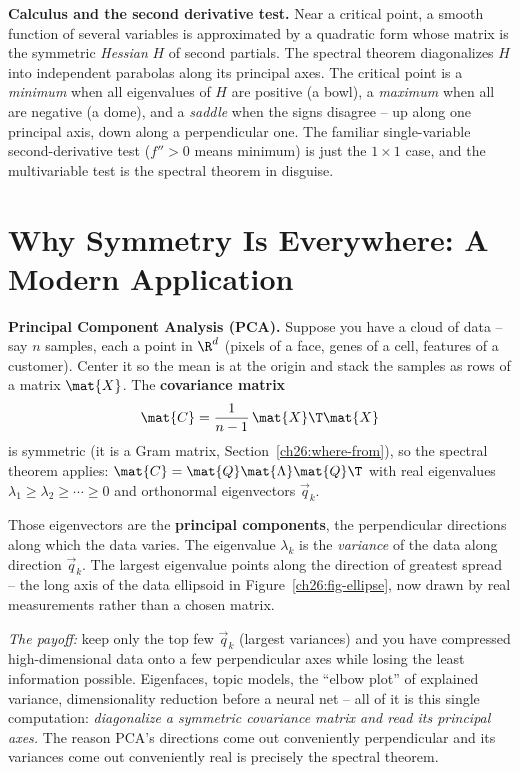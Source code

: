 \begin{connectionbox}
\textbf{Calculus and the second derivative test.} Near a critical point, a smooth
function of several variables is approximated by a quadratic form whose matrix is
the symmetric \emph{Hessian} $H$ of second partials. The spectral theorem
diagonalizes $H$ into independent parabolas along its principal axes. The critical
point is a \emph{minimum} when all eigenvalues of $H$ are positive (a bowl), a
\emph{maximum} when all are negative (a dome), and a \emph{saddle} when the signs
disagree -- up along one principal axis, down along a perpendicular one. The
familiar single-variable second-derivative test ($f''>0$ means minimum) is just
the $1\times 1$ case, and the multivariable test is the spectral theorem in
disguise.
\end{connectionbox}

\section{Why Symmetry Is Everywhere: A Modern Application}
\label{ch26:application}

\begin{applicationbox}
\textbf{Principal Component Analysis (PCA).} Suppose you have a cloud of data --
say $n$ samples, each a point in $\R^d$ (pixels of a face, genes of a cell,
features of a customer). Center it so the mean is at the origin and stack the
samples as rows of a matrix $\mat{X}$. The \textbf{covariance matrix}
\[
  \mat{C} = \frac{1}{n-1}\,\mat{X}\T\mat{X}
\]
is symmetric (it is a Gram matrix, Section~\ref{ch26:where-from}), so the spectral
theorem applies: $\mat{C} = \mat{Q}\mat{\Lambda}\mat{Q}\T$ with real eigenvalues
$\lambda_1 \ge \lambda_2 \ge \cdots \ge 0$ and orthonormal eigenvectors
$\vec{q}_k$.

Those eigenvectors are the \textbf{principal components}, the perpendicular
directions along which the data varies. The eigenvalue $\lambda_k$ is the
\emph{variance} of the data along direction $\vec{q}_k$. The largest eigenvalue
points along the direction of greatest spread -- the long axis of the data
ellipsoid in Figure~\ref{ch26:fig-ellipse}, now drawn by real measurements rather
than a chosen matrix.

\emph{The payoff:} keep only the top few $\vec{q}_k$ (largest variances) and you
have compressed high-dimensional data onto a few perpendicular axes while losing
the least information possible. Eigenfaces, topic models, the ``elbow plot'' of
explained variance, dimensionality reduction before a neural net -- all of it is
this single computation: \emph{diagonalize a symmetric covariance matrix and read
its principal axes.} The reason PCA's directions come out conveniently
perpendicular and its variances come out conveniently real is precisely the
spectral theorem.
\end{applicationbox}

